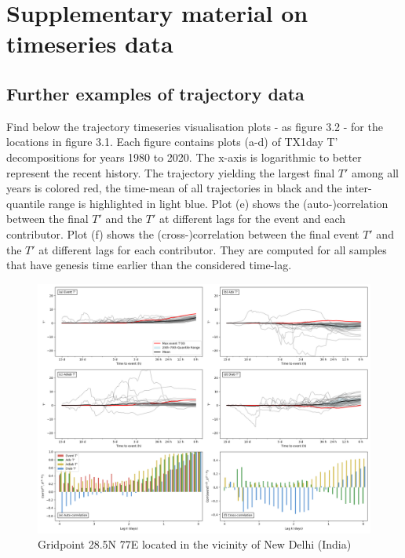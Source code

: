 \chapter{Supplementary material on timeseries data}

\section{Further examples of trajectory data}

Find below the trajectory timeseries visualisation plots - as figure 3.2 - for the locations in figure 3.1. Each figure contains plots (a-d) of TX1day T’ decompositions for years 1980 to 2020. The x-axis is logarithmic to better represent the recent history. The trajectory yielding the largest final $T'$ among all years is colored red, the time-mean of all trajectories in black and the inter-quantile range is highlighted in light blue. Plot (e) shows the (auto-)correlation between the final $T'$ and the $T'$ at different lags for the event and each contributor. Plot (f) shows the (cross-)correlation between the final event $T'$ and the $T'$ at different lags for each contributor. They are computed for all samples that have genesis time earlier than the considered time-lag.

\begin{figure}[h]
\includegraphics[width=\textwidth]{images/sup1.png}
\caption{Gridpoint 28.5N 77E located in the vicinity of New Delhi (India)}
\end{figure}

